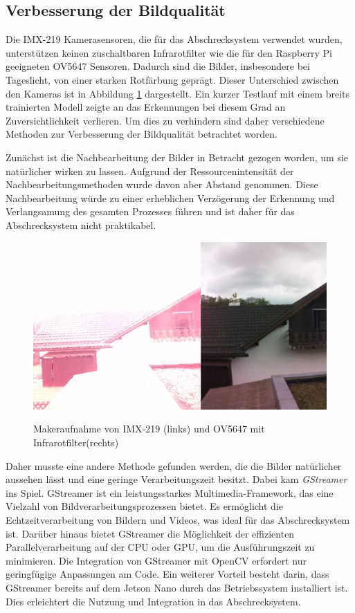 \subsection{Verbesserung der Bildqualität}

Die IMX-219 Kamerasensoren, die für das Abschrecksystem verwendet wurden, unterstützen keinen zuschaltbaren Infrarotfilter wie die für den Raspberry Pi geeigneten OV5647 Sensoren. Dadurch sind die Bilder, insbesondere bei Tageslicht, von einer starken Rotfärbung geprägt. Dieser Unterschied zwischen den Kameras ist in Abbildung \ref{fig:vgl_day} dargestellt. Ein kurzer Testlauf mit einem breits trainierten Modell zeigte an das Erkennungen bei diesem Grad an Zuversichtlichkeit verlieren. Um dies zu verhindern sind daher verschiedene Methoden zur Verbesserung der Bildqualität betrachtet worden.

Zunächst ist die Nachbearbeitung der Bilder in Betracht gezogen worden, um sie natürlicher wirken zu lassen. Aufgrund der Ressourcenintensität der Nachbearbeitungsmethoden wurde davon aber Abstand genommen. Diese Nachbearbeitung würde zu einer erheblichen Verzögerung der Erkennung und Verlangsamung des gesamten Prozesses führen und ist daher für das Abschrecksystem nicht praktikabel.

\begin{figure}[H]
    \centering
    \includegraphics[width=\textwidth]{images/vgl_imx_ov_day.png}
    \label{fig:vgl_day}
    \caption{Makeraufnahme von IMX-219 (links) und OV5647 mit Infrarotfilter(rechts)}
\end{figure}

Daher musste eine andere Methode gefunden werden, die die Bilder natürlicher aussehen lässt und eine geringe Verarbeitungszeit besitzt. Dabei kam \textit{GStreamer} ins Spiel. GStreamer ist ein leistungsstarkes Multimedia-Framework, das eine Vielzahl von Bildverarbeitungsprozessen bietet. Es ermöglicht die Echtzeitverarbeitung von Bildern und Videos, was ideal für das Abschrecksystem ist. Darüber hinaus bietet GStreamer die Möglichkeit der effizienten Parallelverarbeitung auf der CPU oder GPU, um die Ausführungszeit zu minimieren. Die Integration von GStreamer mit OpenCV erfordert nur geringfügige Anpassungen am Code. Ein weiterer Vorteil besteht darin, dass GStreamer bereits auf dem Jetson Nano durch das Betriebssystem installiert ist. Dies erleichtert die Nutzung und Integration in das Abschrecksystem. \cite{gstreamer}

